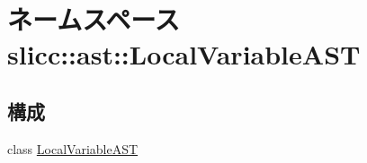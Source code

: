 \hypertarget{namespaceslicc_1_1ast_1_1LocalVariableAST}{
\section{ネームスペース slicc::ast::LocalVariableAST}
\label{namespaceslicc_1_1ast_1_1LocalVariableAST}
}
\subsection*{構成}
\begin{DoxyCompactItemize}
\item 
class \hyperlink{classslicc_1_1ast_1_1LocalVariableAST_1_1LocalVariableAST}{LocalVariableAST}
\end{DoxyCompactItemize}
